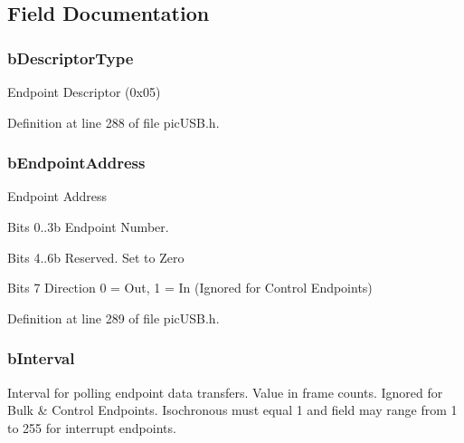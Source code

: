 \subsection{Field Documentation}
\hypertarget{struct_u_s_b___endpoint___descriptor_af6d6c7e334878414c973fc10e54cfb4e}{
\subsubsection[{b\-Descriptor\-Type}]{ b\-Descriptor\-Type}}\label{struct_u_s_b___endpoint___descriptor_af6d6c7e334878414c973fc10e54cfb4e}
Endpoint Descriptor (0x05) 

Definition at line 288 of file pic\-U\-S\-B.\-h.

\hypertarget{struct_u_s_b___endpoint___descriptor_a8351ae3c49da08fc3a37d58d4a0e2d84}{
\subsubsection[{b\-Endpoint\-Address}]{ b\-Endpoint\-Address}}\label{struct_u_s_b___endpoint___descriptor_a8351ae3c49da08fc3a37d58d4a0e2d84}
Endpoint Address
\begin{DoxyItemize}
\item Bits 0..3b Endpoint Number.
\item Bits 4..6b Reserved. Set to Zero
\item Bits 7 Direction 0 = Out, 1 = In (Ignored for Control Endpoints)
\end{DoxyItemize}

Definition at line 289 of file pic\-U\-S\-B.\-h.

\hypertarget{struct_u_s_b___endpoint___descriptor_a7284387b387d9ade2b7537ee8f87372e}{
\subsubsection[{b\-Interval}]{ b\-Interval}}\label{struct_u_s_b___endpoint___descriptor_a7284387b387d9ade2b7537ee8f87372e}
Interval for polling endpoint data transfers. Value in frame counts. Ignored for Bulk \& Control Endpoints. Isochronous must equal 1 and field may range from 1 to 255 for interrupt endpoints. 


